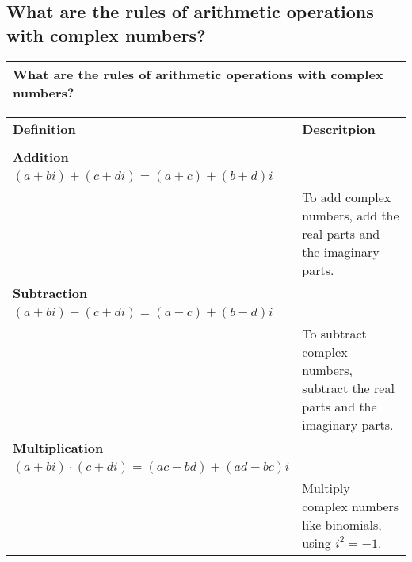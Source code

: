 \subsection{What are the rules of arithmetic operations with complex numbers?}
\begin{small}
    \begin{tabularx}{1\textwidth}{
            p{}
        }
        \toprule
            What are the rules of arithmetic operations with complex numbers?
        \\
        \bottomrule
    \end{tabularx}
\end{small}
\begin{small}
    \begin{tabularx}{1\textwidth}{
            p{}
            p{}
        }
        \toprule
        \textbf{Definition} & \textbf{Descritpion} \\
        \\
        \midrule
        \textbf{Addition} \\
        $ \left(a + bi\right) + \left(c + di\right) = \left(a + c \right) +
        \left(b + d\right)i $
        \\
        &
        To add complex numbers, add the real parts and the imaginary parts.
        \\
        \midrule
        \textbf{Subtraction} \\
        $ \left(a + bi\right) - \left(c + di\right) = \left(a - c \right) +
        \left(b - d\right)i $
        \\
        &
        To subtract complex numbers, subtract the real parts and the imaginary
        parts.
        \\
        \midrule
        \textbf{Multiplication} \\
        $ \left(a + bi\right) \cdot \left(c + di\right) = \left(ac - bd \right) +
        \left(ad - bc\right)i $
        \\
        &
        Multiply complex numbers like binomials, using $i^2 = -1$.
        \\
        \bottomrule

    \end{tabularx}
\end{small}
